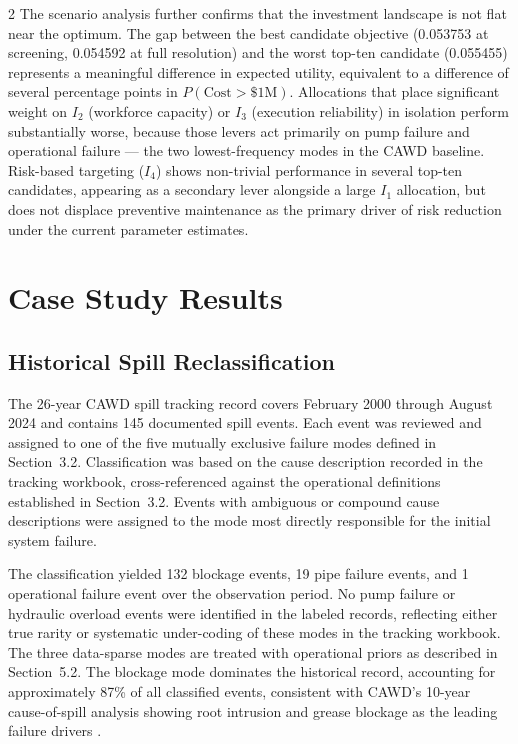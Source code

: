 \documentclass[10pt]{article}
\begin{document}
\begin{multicols}{2}
The scenario analysis further confirms that the investment
landscape is not flat near the optimum. The gap between the
best candidate objective (0.053753 at screening, 0.054592 at
full resolution) and the worst top-ten candidate (0.055455)
represents a meaningful difference in expected utility, equivalent
to a difference of several percentage points in $P(\text{Cost} >
\$1\text{M})$. Allocations that place significant weight on
$I_2$ (workforce capacity) or $I_3$ (execution reliability)
in isolation perform substantially worse, because those levers
act primarily on pump failure and operational failure --- the
two lowest-frequency modes in the CAWD baseline. Risk-based
targeting ($I_4$) shows non-trivial performance in several
top-ten candidates, appearing as a secondary lever alongside
a large $I_1$ allocation, but does not displace preventive
maintenance as the primary driver of risk reduction under the
current parameter estimates.

\section{Case Study Results}

\subsection{Historical Spill Reclassification}
 
The 26-year CAWD spill tracking record covers February 2000 through
August 2024 and contains 145 documented spill events. Each event was
reviewed and assigned to one of the five mutually exclusive failure
modes defined in Section~3.2. Classification was based on the cause
description recorded in the tracking workbook, cross-referenced against
the operational definitions established in Section~3.2. Events with
ambiguous or compound cause descriptions were assigned to the mode most
directly responsible for the initial system failure.
 
The classification yielded 132 blockage events, 19 pipe failure events,
and 1 operational failure event over the observation period. No pump
failure or hydraulic overload events were identified in the labeled
records, reflecting either true rarity or systematic under-coding of
these modes in the tracking workbook. The three data-sparse modes are
treated with operational priors as described in Section~5.2. The
blockage mode dominates the historical record, accounting for
approximately 87\% of all classified events, consistent with CAWD's
10-year cause-of-spill analysis showing root intrusion and grease
blockage as the leading failure drivers \citep{cawd2025}.
 

\end{multicols}
\end{document}
